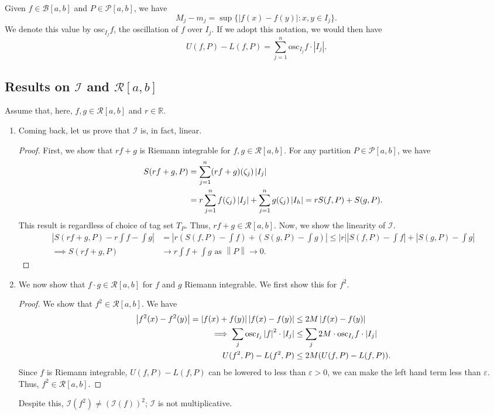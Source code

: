 \documentclass[15pt,a4paper]{book}
\theoremstyle{definition}
\newcommand{\abs}[1]{\left| #1 \right|} %
\newcommand{\R}{\mathbb{R}} %
\newcommand{\cP}{\mathcal{P}}
\newcommand{\cR}{\mathcal{R}}
\newcommand{\cB}{\mathcal{B}}
\newcommand{\cI}{\mathcal{I}}
\newcommand{\osc}{\text{osc}}
\newcommand{\norm}[1]{\left\lVert#1\right\rVert}
\begin{document}
Given $f \in \cB[a,b]$ and $P \in \cP[a,b]$, we have
\begin{equation}
    M_{j} - m_{j} = \sup\{\abs{f(x)-f(y)} : x,y \in I_{j}\}.
\end{equation}
We denote this value by $\osc_{I_{j}} f$, the oscillation of $f$ over $I_{j}$. If we adopt this notation, we would then have
\begin{equation}
    U(f,P) - L(f,P) = \sum_{j=1}^{n} \osc_{I_{j}} f \cdot \abs{I_{j}}.
\end{equation}
\subsection{Results on $\cI$ and $\cR[a,b]$}
Assume that, here, $f,g \in \cR[a,b]$ and $r \in \R$.
\begin{enumerate}
\item Coming back, let us prove that $\cI$ is, in fact, linear.
\begin{proof}
    First, we show that $rf+g$ is Riemann integrable for $f,g \in \cR[a,b]$. For any partition $P \in \cP[a,b]$, we have
    \begin{align}
        S(rf+g,P) &= \sum_{j=1}^{n} (rf+g)(\zeta_{j})\abs{I_{j}} \notag \\
        &= r \sum_{j=1}^{n} f(\zeta_{j})\abs{I_{j}} + \sum_{j=1}^{n} g(\zeta_{j}) \abs{I_{h}} = rS(f,P)+S(g,P).
    \end{align}
    This result is regardless of choice of tag set $T_{P}$. Thus, $rf+g \in \cR[a,b]$. Now, we show the linearity of $\cI$.
    \begin{align}
        \abs{S(rf+g,P) -r\int f - \int g} &= \abs{r(S(f,P)-\int f) + (S(g,P) - \int g)} \leq \abs{r}\abs{S(f,P)-\int f} + \abs{S(g,P)- \int g} \\
        \implies S(rf+g,P) &\to r \int f + \int g \text{ as } \norm{P} \to 0.
    \end{align}
\end{proof}
\item We now show that $f \cdot g \in \cR[a,b]$ for $f$ and $g$ Riemann integrable. We first show this for $f^{2}$.
\begin{proof}
    We show that $f^{2} \in \cR[a,b]$. We have
    \begin{align}
        \abs{f^{2}(x)-f^{2}(y)} = \abs{f(x)+f(y)}\abs{f(x)-f(y)} &\leq 2M \abs{f(x)-f(y)} \notag \\
        \implies \sum_{j} \osc_{I_{j}} \abs{f}^{2} \cdot \abs{I_{j}} &\leq \sum_{j} 2M \cdot \osc_{I_{j}} f \cdot \abs{I_{j}} \notag \\
        U(f^{2},P)-L(f^{2},P) &\leq 2M(U(f,P)-L(f,P)).
    \end{align}
    Since $f$ is Riemann integrable, $U(f,P)-L(f,P)$ can be lowered to less than $\varepsilon > 0$, we can make the left hand term less than $\varepsilon$. Thus, $f^{2} \in \cR[a,b]$.
\end{proof}
Despite this, $\cI(f^{2}) \neq (\cI(f))^{2}$; $\cI$ is not multiplicative.


\end{enumerate}
\end{document}
